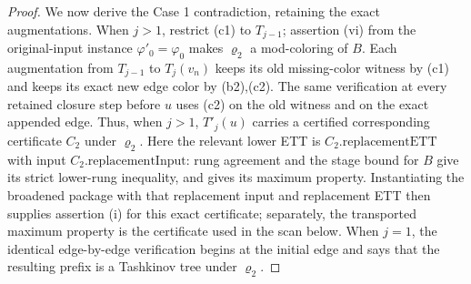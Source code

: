 \begin{proof}
We now derive the Case 1 contradiction, retaining the exact
augmentations.  When \(j>1\), restrict (c1) to \(T_{j-1}\); assertion
(vi) from the original-input instance \(\varphi'_0=\varphi_0\) makes
\(\varrho_2\) a mod-coloring of \(B\).  Each
augmentation from \(T_{j-1}\) to \(T_j(v_n)\) keeps its old
missing-color witness by (c1)
and keeps its exact new edge color by (b2),(c2).  The same verification
at every retained closure step before \(u\) uses (c2) on the old witness
and on the exact appended edge.  Thus, when \(j>1\), \(T'_j(u)\) carries
a certified corresponding certificate \(C_2\) under \(\varrho_2\).
Here the relevant lower ETT is \(C_2.\mathrm{replacementETT}\) with input
\(C_2.\mathrm{replacementInput}\): rung agreement and the stage bound for
\(B\) give its strict lower-rung inequality, and
 gives its maximum property.  Instantiating
the broadened package with that replacement input and replacement ETT then
supplies assertion (i) for this exact certificate; separately, the
transported maximum property is the certificate used in the scan below.  When
\(j=1\), the identical edge-by-edge verification begins at the initial
edge and 
says that the resulting prefix is a Tashkinov tree under \(\varrho_2\).


\end{proof}
